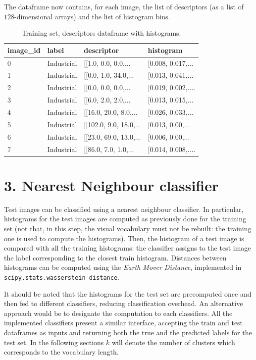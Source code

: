 \documentclass[12pt]{article}
\begin{document}
  The dataframe now contains, for each image, the list of descriptors (as a list of \( 128 \)-dimensional arrays) and the list of histogram bins.

	\begin{table}[H] 
		\centering
		\caption*{Training set, descriptors dataframe with histograms.}
		\begin{tabular}{llll}
			\toprule
      image\_id & label & descriptor & histogram \\
      \midrule
      0 &  Industrial &  [[1.0, 0.0, 0.0,...    &  [0.008, 0.017,... \\
      1 &  Industrial &  [[0.0, 1.0, 34.0,...   &  [0.013, 0.041,... \\
      2 &  Industrial &  [[0.0, 0.0, 0.0,...    &  [0.019, 0.002,.... \\
      3 &  Industrial &  [[6.0, 2.0, 2.0,...    &  [0.013, 0.015,... \\
      4 &  Industrial &  [[16.0, 20.0, 8.0,...  &  [0.026, 0.033,... \\
      5 &  Industrial &  [[102.0, 9.0, 18.0,... &  [0.013, 0.00,... \\
      6 &  Industrial &  [[23.0, 69.0, 13.0,... &  [0.006, 0.00,... \\
      7 &  Industrial &  [[86.0, 7.0, 1.0,...   &  [0.014, 0.008,.... \\
			\bottomrule
		\end{tabular}
	\end{table}


  \section*{3. Nearest Neighbour classifier}

  Test images can be classified using a nearest neighbour classifier. In particular, histograms for the test images are computed as previously done for the training set (not that, in this step, the visual vocabulary must not be rebuilt: the training one is used to compute the histograms). Then, the histogram of a test image is compared with all the training histograms: the classifier assigns to the test image the label corresponding to the closest train histogram. Distances between histograms can be computed using the \textit{Earth Mover Distance}, implemented in \texttt{scipy.stats.wasserstein\_distance}.
  
  It should be noted that the histograms for the test set are precomputed once and then fed to different classifiers, reducing classification overhead. An alternative approach would be to designate the computation to each classifiers. All the implemented classifiers present a similar interface, accepting the train and test dataframes as inputs and returning both the true and the predicted labels for the test set. In the following sections \( k \) will denote the number of clusters which corresponds to the vocabulary length.
\end{document}
